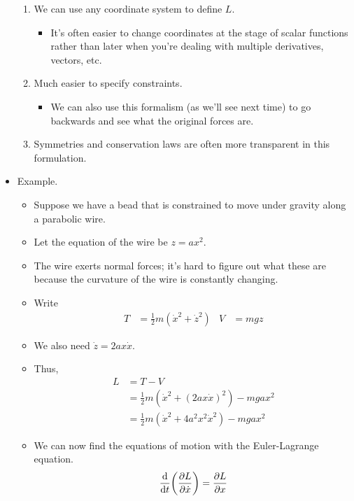 \documentclass[../notes.tex]{subfiles}
\begin{document}
\begin{itemize}
\begin{enumerate}
        \item We can use any coordinate system to define $L$.
        \begin{itemize}
            \item It's often easier to change coordinates at the stage of scalar functions rather than later when you're dealing with multiple derivatives, vectors, etc.
        \end{itemize}
        \item Much easier to specify constraints.
        \begin{itemize}
            \item We can also use this formalism (as we'll see next time) to go backwards and see what the original forces are.
        \end{itemize}
        \item Symmetries and conservation laws are often more transparent in this formulation.
    \end{enumerate}
    \item Example.
    \begin{itemize}
        \item Suppose we have a bead that is constrained to move under gravity along a parabolic wire.
        \item Let the equation of the wire be $z=ax^2$.
        \item The wire exerts normal forces; it's hard to figure out what these are because the curvature of the wire is constantly changing.
        \item Write
        \begin{align*}
            T &= \frac{1}{2}m(\dot{x}^2+\dot{z}^2)&
            V &= mgz
        \end{align*}
        \item We also need $\dot{z}=2ax\dot{x}$.
        \item Thus,
        \begin{align*}
            L &= T-V\\
            &= \frac{1}{2}m(\dot{x}^2+(2ax\dot{x})^2)-mgax^2\\
            &= \frac{1}{2}m(\dot{x}^2+4a^2x^2\dot{x}^2)-mgax^2
        \end{align*}
        \item We can now find the equations of motion with the Euler-Lagrange equation.
        \begin{align*}
            \dv{t}(\pdv{L}{\dot{x}}) &= \pdv{L}{x}\\

\end{align*}
\end{itemize}
\end{itemize}
\end{document}

